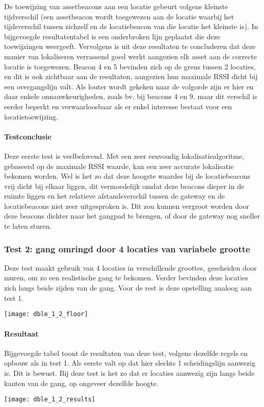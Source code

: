 De toewijzing van assetbeacons aan een locatie gebeurt volgens kleinste tijdverschil (een assetbeacon wordt toegewezen aan de locatie waarbij het tijdsverschil tussen zichzelf en de locatiebeacon van die locatie het kleinste is). In bijgevoegde resultatentabel is een onderbroken lijn geplaatst die deze toewijzingen weergeeft.
Vervolgens is uit deze resultaten te concluderen dat deze manier van lokaliseren verrassend goed werkt aangezien elk asset aan de correcte locatie is toegewezen. Beacon 4 en 5 bevinden zich op de grens tussen 2 locaties, en dit is ook zichtbaar aan de resultaten, aangezien hun maximale RSSI dicht bij een overgangslijn valt. Als louter wordt gekeken naar de volgorde zijn er hier en daar enkele onnauwkeurigheden, zoals bv. bij beacons 4 en 9, maar dit verschil is eerder beperkt en verwaarloosbaar als er enkel interesse bestaat voor een locatietoewijzing.

\paragraph{Testconclusie}
Deze eerste test is veelbelovend. Met een zeer eenvoudig lokalisatiealgoritme, gebaseerd op de maximale RSSI waarde, kan een zeer accurate lokalisatie bekomen worden. Wel is het zo dat deze hoogste waardes bij de locatiebeacons vrij dicht bij elkaar liggen, dit vermoedelijk omdat deze beacons dieper in de ruimte liggen en het relatieve afstandsverschil tussen de gateway en de locatiebeacons niet zeer uitgesproken is. Dit zou kunnen vergroot worden door deze beacons dichter naar het gangpad te brengen, of door de gateway nog sneller te laten sturen.

\subsubsection{Test 2: gang omringd door 4 locaties van variabele grootte}
\begin{minipage}{0.55\textwidth}
Deze test maakt gebruik van 4 locaties in verschillende groottes, gescheiden door muren, om zo een realistische gang te bekomen. Verder bevinden deze locaties zich langs beide zijden van de gang. Voor de rest is deze opstelling analoog aan test 1.
\end{minipage}
\hfill
\begin{minipage}{0.42\textwidth}
	\texttt{[image: dble\_1\_2\_floor]}
\end{minipage}

\paragraph{Resultaat}
\begin{minipage}{0.42\textwidth}
Bijgevoegde tabel toont de resultaten van deze test, volgens dezelfde regels en opbouw als in test 1. Als eerste valt op dat hier slechts 1 scheidingslijn aanwezig is. Dit is bewust. Bij deze test is het zo dat er locaties aanwezig zijn langs beide kanten van de gang, op ongeveer dezelfde hoogte. 
\end{minipage}
\hfill
\begin{minipage}{0.55\textwidth}
	\texttt{[image: dble\_1\_2\_results]}
\end{minipage}

